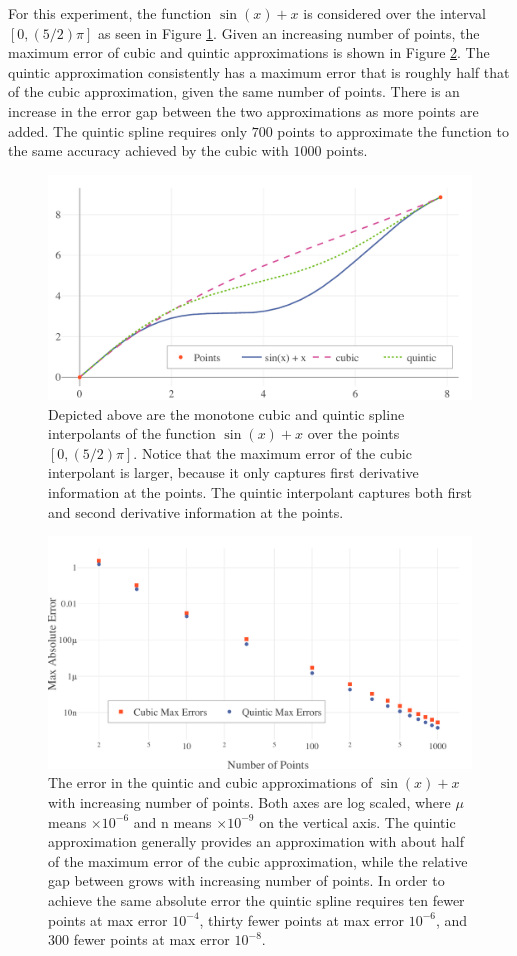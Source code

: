 \documentclass{scspaperproc}
\theoremstyle{scsthe}
\begin{document}
For this experiment, the function $\sin(x) + x$ is considered over the interval $[0,(5/2)\pi]$ as seen in Figure \ref{fig:cubic_quintic_sin}. Given an increasing number of points, the maximum error of cubic and quintic approximations is shown in Figure \ref{fig:experiment_1}. The quintic approximation consistently has a maximum error that is roughly half that of the cubic approximation, given the same number of points. There is an increase in the error gap between the two approximations as more points are added. The quintic spline requires only $700$ points to approximate the function to the same accuracy achieved by the cubic with $1000$ points.

\begin{figure}
  \centering
  \includegraphics[width=.7\textwidth]{cubic-quintic-sin}
  \caption{Depicted above are the monotone cubic and quintic spline interpolants of the function $\sin(x) + x$ over the points $[0, (5/2) \pi]$.  Notice that the maximum error of the cubic interpolant is larger, because it only captures first derivative information at the points. The quintic interpolant captures both first and second derivative information at the points.}
  \label{fig:cubic_quintic_sin}
\end{figure}

\begin{figure}
  \centering
  \includegraphics[width=.7\textwidth]{experiment_1_errors}
  \caption{The error in the quintic and cubic approximations of $\sin(x) + x$ with increasing number of points. Both axes are log scaled, where $\mu$ means $\times 10^{-6}$ and n means $\times 10^{-9}$ on the vertical axis. The quintic approximation generally provides an approximation with about half of the maximum error of the cubic approximation, while the relative gap between grows with increasing number of points. In order to achieve the same absolute error the quintic spline requires ten fewer points at max error $10^{-4}$, thirty fewer points at max error $10^{-6}$, and $300$ fewer points at max error $10^{-8}$.}
  \label{fig:experiment_1}
\end{figure}
\end{document}
